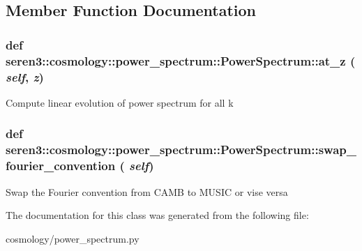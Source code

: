 \subsection{Member Function Documentation}
\hypertarget{classseren3_1_1cosmology_1_1power__spectrum_1_1PowerSpectrum_a86a39b95d4985a9fb82cecd613513024}{
\subsubsection[{at\_\-z}]{\setlength{\rightskip}{0pt plus 5cm}def seren3::cosmology::power\_\-spectrum::PowerSpectrum::at\_\-z ( {\em self}, \/   {\em z})}}
\label{classseren3_1_1cosmology_1_1power__spectrum_1_1PowerSpectrum_a86a39b95d4985a9fb82cecd613513024}
\begin{DoxyVerb}
Compute linear evolution of power spectrum for all k
\end{DoxyVerb}
 \hypertarget{classseren3_1_1cosmology_1_1power__spectrum_1_1PowerSpectrum_a3e2a91cb58acc6f61f7ef4f17025a73c}{
\subsubsection[{swap\_\-fourier\_\-convention}]{\setlength{\rightskip}{0pt plus 5cm}def seren3::cosmology::power\_\-spectrum::PowerSpectrum::swap\_\-fourier\_\-convention ( {\em self})}}
\label{classseren3_1_1cosmology_1_1power__spectrum_1_1PowerSpectrum_a3e2a91cb58acc6f61f7ef4f17025a73c}
\begin{DoxyVerb}
Swap the Fourier convention from CAMB to MUSIC or vise versa
\end{DoxyVerb}
 

The documentation for this class was generated from the following file:\begin{DoxyCompactItemize}
\item 
cosmology/power\_\-spectrum.py\end{DoxyCompactItemize}
